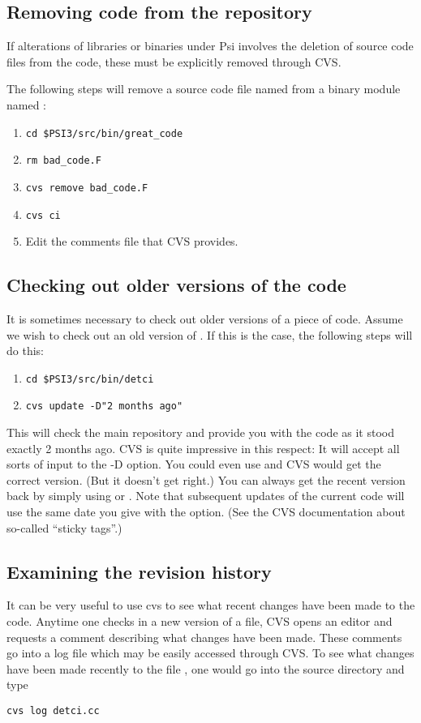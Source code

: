 \subsection{Removing code from the repository}
If alterations of libraries or binaries under Psi involves the deletion of 
source code files from the code, these must be explicitly removed through CVS.

The following steps will remove a source code file named  
from a binary module named :
\begin{enumerate}
\item {\tt cd \$PSI3/src/bin/great\_code}
\item {\tt rm bad\_code.F}
\item {\tt cvs remove bad\_code.F}
\item {\tt cvs ci}
\item Edit the comments file that CVS provides. 
\end{enumerate}

\subsection{Checking out older versions of the code}
It is sometimes necessary to check out older versions of a piece of code.
Assume we wish to check out an old version of \PSIdetci. If this
is the case, the following steps will do this:
\begin{enumerate}
\item {\tt cd \$PSI3/src/bin/detci}
\item {\tt cvs update -D"2 months ago"}
\end{enumerate}

This will check the main repository and provide you with the code as
it stood exactly 2 months ago. CVS is quite impressive in this respect:
It will accept all sorts of input to the -D option. You could even use
 and CVS would get the correct version. (But it
doesn't get  right.)  You can always get the
recent version back by simply using  or . Note
that subsequent updates of the current code will use the same date you
give with the  option.  (See the CVS documentation about so-called
``sticky tags''.)

\subsection{Examining the revision history}
It can be very useful to use cvs to see what recent changes have been made to 
the code.  Anytime one checks in a new version of a file, CVS opens an
editor and requests a comment describing what changes have been made.
These comments go into a log file which may be easily
accessed through CVS.  To see what changes have been made recently
to the file , one would go into the  source
directory and type
\begin{verbatim}
cvs log detci.cc
\end{verbatim}

